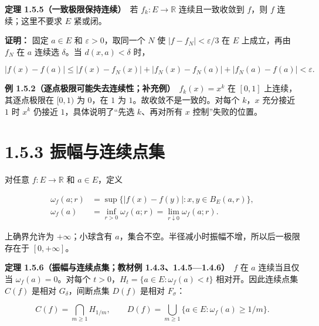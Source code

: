 \documentclass[11pt,a4paper]{article}
\begin{document}
\textbf{定理 1.5.5（一致极限保持连续）}　若 \(f_k:E\to\mathbb R\)
连续且一致收敛到 \(f\)，则 \(f\) 连续；这里不要求 \(E\) 紧或闭。

\textbf{证明：} 固定 \(a\in E\) 和 \(\varepsilon>0\)，取同一个 \(N\) 使
\(|f-f_N|<\varepsilon/3\) 在 \(E\) 上成立，再由 \(f_N\) 在 \(a\) 连续选
\(\delta\)。当 \(d(x,a)<\delta\) 时，

\begin{equation*}
|f(x)-f(a)|\le |f(x)-f_N(x)|+|f_N(x)-f_N(a)|+|f_N(a)-f(a)|<\varepsilon.
\tag{1.5.2}
\end{equation*}

\textbf{例 1.5.2（逐点极限可能失去连续性；补充例）}　\(f_k(x)=x^k\) 在
\([0,1]\) 上连续，其逐点极限在 \([0,1)\) 为 \(0\)，在 \(1\) 为
\(1\)。故收敛不是一致的。对每个 \(k\)，\(x\) 充分接近 \(1\) 时 \(x^k\)
仍接近 \(1\)，具体说明了``先选 \(k\)、再对所有 \(x\) 控制''失败的位置。

\section[\S{}1.5.3
振幅与连续点集]{1.5.3
振幅与连续点集}\label{ux632fux5e45ux4e0eux8fdeux7eedux70b9ux96c6}

对任意 \(f:E\to\mathbb R\) 和 \(a\in E\)，定义

\begin{equation*}
\begin{aligned}
\omega_f(a;r)&=\sup\{|f(x)-f(y)|:x,y\in B_E(a,r)\},\\
\omega_f(a)&=\inf_{r>0}\omega_f(a;r)=\lim_{r\downarrow0}\omega_f(a;r).
\end{aligned}\tag{1.5.3}
\end{equation*}

上确界允许为 \(+\infty\)；小球含有
\(a\)，集合不空。半径减小时振幅不增，所以后一极限存在于
\([0,+\infty]\)。

\textbf{定理 1.5.6（振幅与连续点集；教材例
1.4.3、1.4.5---1.4.6）}　\(f\) 在 \(a\) 连续当且仅当
\(\omega_f(a)=0\)。对每个 \(t>0\)，\(H_t=\{a\in E:\omega_f(a)<t\}\)
相对开。因此连续点集 \(C(f)\) 是相对 \(G_\delta\)，间断点集 \(D(f)\)
是相对 \(F_\sigma\)：

\begin{equation*}
C(f)=\bigcap_{m\ge1}H_{1/m},\qquad
D(f)=\bigcup_{m\ge1}\{a\in E:\omega_f(a)\ge1/m\}.
\tag{1.5.4}
\end{equation*}
\end{document}
